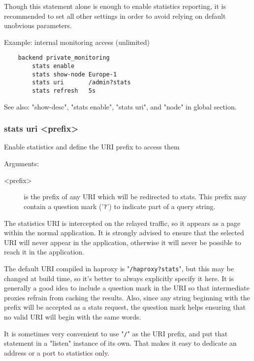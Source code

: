   Though this statement alone is enough to enable statistics reporting, it is
  recommended to set all other settings in order to avoid relying on default
  unobvious parameters.

  Example: internal monitoring access (unlimited)
  \begin{verbatim}
    backend private_monitoring
        stats enable
        stats show-node Europe-1
        stats uri       /admin?stats
        stats refresh   5s
  \end{verbatim}

  See also: "show-desc", "stats enable", "stats uri", and "node" in global
            section.

\subsubsection[stats uri]{stats uri <prefix>}


  Enable statistics and define the URI prefix to access them


  Arguments:
  \begin{description}
  \item[<prefix>] is the prefix of any URI which will be redirected to stats. This
              prefix may contain a question mark ('\verb|?|') to indicate part of a
              query string.
  \end{description}

  The statistics URI is intercepted on the relayed traffic, so it appears as a
  page within the normal application. It is strongly advised to ensure that the
  selected URI will never appear in the application, otherwise it will never be
  possible to reach it in the application.

  The default URI compiled in haproxy is "\verb|/haproxy?stats|", but this may be
  changed at build time, so it's better to always explicitly specify it here.
  It is generally a good idea to include a question mark in the URI so that
  intermediate proxies refrain from caching the results. Also, since any string
  beginning with the prefix will be accepted as a stats request, the question
  mark helps ensuring that no valid URI will begin with the same words.

  It is sometimes very convenient to use "\verb|/|" as the URI prefix, and put that
  statement in a "listen" instance of its own. That makes it easy to dedicate
  an address or a port to statistics only.

